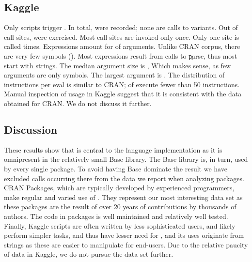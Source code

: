 \documentclass[screen,acmsmall]{acmart}
\begin{document}
\medskip

\subsection{Kaggle}
Only \kaggleNbruns scripts trigger \eval. In total, \kaggleAllcalls \eval were
recorded; none are calls to variants. Out of \kaggleStaticeval call sites,
\kaggleTriggeredeval were exercised. Most call sites are invoked only once. Only
one site is called \kaggleMaxcalls times. Expressions amount for
\kaggleCodepercent of arguments. Unlike CRAN corpus, there are very few symbols
(\kaggleSymbolpercent). Most expressions result from calls to \c{parse}, thus
most \evals start with strings. The median argument size is \kaggleMedianszeval,
Which makes sense, as few arguments are only symbols. The largest argument is
\kaggleMaxszeval. The distribution of instructions per eval is similar to CRAN;
\kaggleSmalleventspct of \evals execute fewer than 50 instructions. Manual
inspection of \eval usage in Kaggle suggest that it is consistent with the data
obtained for CRAN. We do not discuss it further.


\medskip

\subsection{Discussion}
These results show that \eval is central to the language implementation as it is
omnipresent in the relatively small Base library. The Base library is, in turn,
used by every single package. To avoid having Base dominate the result we have
excluded calls occurring there from the data we report when analyzing packages.
CRAN Packages, which are typically developed by experienced programmers, make
regular and varied use of \eval. They represent our most interesting data set as
these packages are the result of over 20 years of contributions by thousands of
authors. The code in packages is well maintained and relatively well tested.
Finally, Kaggle scripts are often written by less sophisticated users, and
likely perform simpler tasks, and thus have lesser need for \eval, and its uses
originate from strings as these are easier to manipulate for end-users. Due to
the relative paucity of data in Kaggle, we do not pursue the data set further.

\newpage
\end{document}
